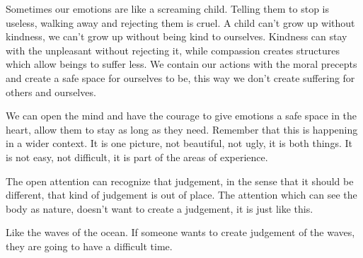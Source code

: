 Sometimes our emotions are like a screaming child. Telling them to stop
is useless, walking away and rejecting them is cruel. A child can't grow
up without kindness, we can't grow up without being kind to ourselves.
Kindness can stay with the unpleasant without rejecting it, while
compassion creates structures which allow beings to suffer less. We
contain our actions with the moral precepts and create a safe space for
ourselves to be, this way we don't create suffering for others and
ourselves.

We can open the mind and have the courage to give emotions a safe space
in the heart, allow them to stay as long as they need. Remember that
this is happening in a wider context. It is one picture, not beautiful,
not ugly, it is both things. It is not easy, not difficult, it is part
of the areas of experience.

The open attention can recognize that judgement, in the sense that it
should be different, that kind of judgement is out of place. The
attention which can see the body as nature, doesn't want to create a
judgement, it is just like this.

Like the waves of the ocean. If someone wants to create judgement of the
waves, they are going to have a difficult time.
